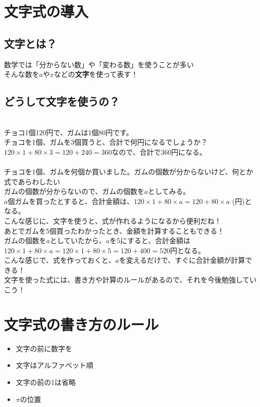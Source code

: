 \documentclass{jsarticle}
\begin{document}
\section{文字式の導入}
\subsection*{文字とは？}
数学では「分からない数」や「変わる数」を使うことが多い\\
そんな数を$a$や$x$などの\textbf{文字}を使って表す！

\subsection*{どうして文字を使うの？}
\\
チョコ1個120円で、ガムは1個80円です。\\
チョコを1個、ガムを3個買うと、合計で何円になるでしょうか？\\
$120 \times 1 + 80 \times 3 = 120 + 240 =360$なので、合計で360円になる。\\

\\
チョコを1個、ガムを何個か買いました。ガムの個数が分からないけど、何とか式であらわしたい\\
ガムの個数が分からないので、ガムの個数を$a$としてみる。\\
$a$個ガムを買ったとすると、合計金額は、$120 \times 1 + 80 \times a =120 + 80 \times a$ (円)となる。\\
こんな感じに、文字を使うと、式が作れるようになるから便利だね！\\

あとでガムを5個買ったわかったとき、金額を計算することもできる！\\
ガムの個数を$a$としていたから、$a$を5にすると、合計金額は\\
$120 \times 1 + 80 \times a = 120 \times 1 + 80 \times 5 =120 + 400 = 520$円となる。\\
こんな感じで、式を作っておくと、$a$を変えるだけで、すぐに合計金額が計算できる！\\


文字を使った式には、書き方や計算のルールがあるので、それを今後勉強していこう！\\


\newpage

\section{文字式の書き方のルール}
\begin{itemize}
\item 文字の前に数字を
\item 文字はアルファベット順
\item 文字の前の1は省略
\item $\pi$の位置
\end{itemize}
\end{document}
